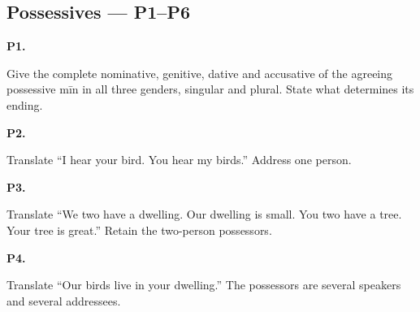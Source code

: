 \subsection*{Possessives — P1–P6}

\par\begin{minipage}{\linewidth}\raggedright
\textbf{P1.}

Give the complete nominative, genitive, dative and accusative of the agreeing possessive mīn in all three genders, singular and plural. State what determines its ending.

\end{minipage}\par\addvspace{4pt}

\par\begin{minipage}{\linewidth}\raggedright
\textbf{P2.}

Translate “I hear your bird. You hear my birds.” Address one person.

\end{minipage}\par\addvspace{4pt}

\par\begin{minipage}{\linewidth}\raggedright
\textbf{P3.}

Translate “We two have a dwelling. Our dwelling is small. You two have a tree. Your tree is great.” Retain the two-person possessors.

\end{minipage}\par\addvspace{4pt}

\par\begin{minipage}{\linewidth}\raggedright
\textbf{P4.}

Translate “Our birds live in your dwelling.” The possessors are several speakers and several addressees.

\end{minipage}\par\addvspace{4pt}

